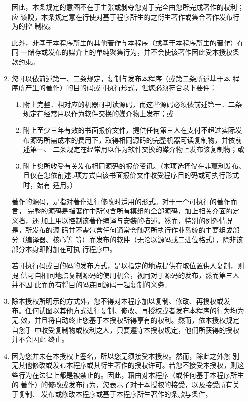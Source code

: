 \begin{enumerate}
因此，本条规定的意图不在于主张或剥夺您对于完全由您所完成著作的权利；应
该說，本条规定意在行使对基于程序所生的之衍生著作或集合著作发布行为的控
制权。

此外，非基于本程序所生的其他著作与本程序（或基于本程序所生的著作）在同
一储存或发布的媒介上的单纯聚集行为，并不会使该著作因此受本授权条款约束。

\item 您可以依前述第一、二条规定，复制与发布本程序（或第二条所述基于本
程序所产生的著作）的目的码或可执行形式，但您必须符合以下要件：
\begin{enumerate}
\item 附上完整、相对应的机器可判读源码，而这些源码必须依前述第一、二条
规定在经常用以作为软件交换的媒介物上发布；或
\item 附上至少三年有效的书面报价文件，提供任何第三人在支付不超过实际发
布源码所需成本的费用下，取得相同源码的完整机器可读复制物，并依前述第一、
二条规定在经常用以作为软件交换的媒介物上发布该复制物；或
\item 附上您所收受有关发布相同源码的报价资讯。（本项选择仅在非赢利发布、
且仅在您依前述b项方式自该书面报价文件收受程序目的码或可执行形式时，始有
适用。）
\end{enumerate}
著作的源码，是指对著作进行修改时适用的形式。对于一个可执行的著作而言，
完整的源码是指著作中所包含所有模组的全部源码，加上相关介面的定义挡，还
加上用以控制该著作编译与安裝的描述。然而，特別的例外情况是，所发布的源
码并不需包含任何通常会随著所执行作业系统的主要组成部分（编译器、核心等
等）而发布的软件（无论以源码或二进位格式），除非该部分本身即附加在可执
行程序中。

若可执行码或目的码的发布方式，是以指定的地点提供存取位置供人复制，则提
供可自相同地点复制源码的使用机会，视同对于源码的发布，然而第三人并不因
此而负有将目的码连同源码一起复制的义务。

\item 除本授权所明示的方式外，您不得对本程序加以复制、修改、再授权或发
布。任何试图以其他方式进行复制、修改、再授权或者发布本程序的行为均为无
效，并且将自动终止您基于本授权所得享有的权利。然而，依本授权规定自您手
中收受复制物或权利之人，只要遵守本授权规定，他们所获得的授权并不会因此
终止。

\item 因为您并未在本授权上签名，所以您无须接受本授权。然而，除此之外您
別无其他修改或发布本程序或其衍生著作的授权许可。若您不接受本授权，则这
些行为在法律上都是被禁止的。因此，藉由对本程序（或任何基于本程序所生的
著作）的修改或发布行为，您表示了对于本授权的接受，以及接受所有关于复制、
发布或修改本程序或基于本程序所生著作的条款与条件。


\end{enumerate}
